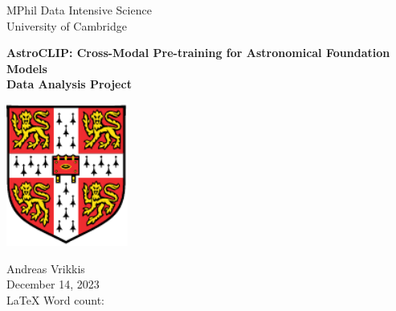 \documentclass[a4paper,12pt]{article}
\begin{document}
    
    \vspace*{3cm}
    
    \begin{center}
     {\Large MPhil Data Intensive Science}  \\ [3pt]
     {\Large University of Cambridge}  \\ [3pt]
     
     \vspace*{1cm}
     \hrulefill
     \vspace*{0.75cm}
     
     {\LARGE \textbf{AstroCLIP: Cross-Modal Pre-training for Astronomical Foundation Models}} \\ [6pt]
     \large \textbf{Data Analysis Project} \\ [6pt]
     \vspace*{0.05cm}
     \hrulefill
     \vspace*{1.5cm}

    \includegraphics[width=0.3\textwidth]{../figures/University_Crest.pdf} 

    \vspace*{1.5cm}
     
     {\Large  Andreas Vrikkis} \\ [6pt]
     {\large  December 14, 2023} \\ [3pt]
     {\large  \LaTeX \hspace{0.03cm} Word count:  } \\ [3pt]
     
     \end{center}   
    
    
    \newpage
    
    \restoregeometry
    
    \newpage
    
    \tableofcontents
    
    \newpage
\end{document}
